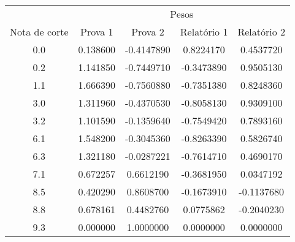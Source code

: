 \begin{tabular}{c cccc}
        \hline
                      & \multicolumn{4}{c}{Pesos}\\ \cline{2-5}
        Nota de corte & Prova 1  & Prova 2 & Relatório 1
        & Relatório 2 \\
        \hline
        0.0  & 0.138600  & -0.4147890  &  0.8224170 &  0.4537720  \\
        0.2  & 1.141850  & -0.7449710  & -0.3473890 &  0.9505130  \\
        1.1  & 1.666390  & -0.7560880  & -0.7351380 &  0.8248360  \\
        3.0  & 1.311960  & -0.4370530  & -0.8058130 &  0.9309100  \\
        3.2  & 1.101590  & -0.1359640  & -0.7549420 &  0.7893160  \\
        6.1  & 1.548200  & -0.3045360  & -0.8263390 &  0.5826740  \\
        6.3  & 1.321180  & -0.0287221  & -0.7614710 &  0.4690170  \\
        7.1  & 0.672257  &  0.6612190  & -0.3681950 &  0.0347192  \\
        8.5  & 0.420290  &  0.8608700  & -0.1673910 & -0.1137680  \\
        8.8  & 0.678161  &  0.4482760  &  0.0775862 & -0.2040230  \\
        9.3  & 0.000000  &  1.0000000  &  0.0000000 &  0.0000000  \\
        \hline
\end{tabular}
